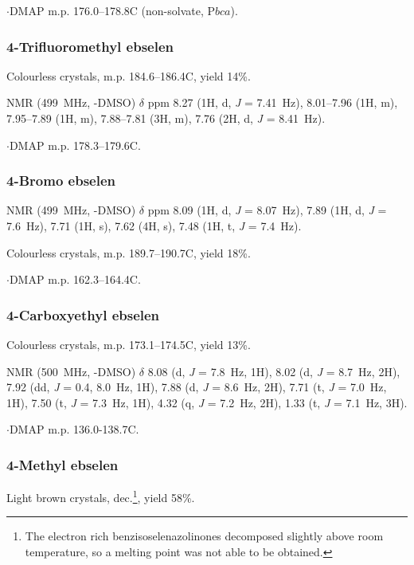 \begin{refsection}
$ \cdot $DMAP m.p. 176.0--178.8\degree{}C (non-solvate, P$bca$).


\subsubsection{4-Trifluoromethyl ebselen }
Colourless crystals, m.p. 184.6--186.4\degree{}C, yield 14\%.

 NMR (499~MHz, -DMSO) $ \delta $ ppm 8.27 (1H, d, \textit{J} = 7.41~Hz), 8.01--7.96 (1H, m), 7.95--7.89 (1H, m), 7.88--7.81 (3H, m), 7.76 (2H, d, \textit{J} = 8.41~Hz).

$ \cdot $DMAP m.p. 178.3--179.6\degree{}C.


\subsubsection{4-Bromo ebselen } 

 NMR (499~MHz, -DMSO) $ \delta $ ppm 8.09 (1H, d, \textit{J} = 8.07~Hz), 7.89 (1H, d, \textit{J} = 7.6~Hz), 7.71 (1H, s), 7.62 (4H, s), 7.48 (1H, t, \textit{J} = 7.4~Hz).

Colourless crystals, m.p. 189.7--190.7\degree{}C, yield 18\%.

$ \cdot $DMAP m.p. 162.3--164.4\degree{}C.


\subsubsection{4-Carboxyethyl ebselen }
Colourless crystals, m.p. 173.1--174.5\degree{}C, yield 13\%.

 NMR (500~MHz, -DMSO) $ \delta $ 8.08 (d, \textit{J} = 7.8~Hz, 1H), 8.02 (d, \textit{J} = 8.7~Hz, 2H), 7.92 (dd, \textit{J} = 0.4, 8.0~Hz, 1H), 7.88 (d, \textit{J} = 8.6~Hz, 2H), 7.71 (t, \textit{J} = 7.0~Hz, 1H), 7.50 (t, \textit{J} = 7.3~Hz, 1H), 4.32 (q, \textit{J} = 7.2~Hz, 2H), 1.33 (t, \textit{J} = 7.1~Hz, 3H).

$ \cdot $DMAP m.p. 136.0-138.7\degree{}C.


\subsubsection{4-Methyl ebselen }
Light brown crystals, dec.\footnote{\label{fn:decompose} The electron rich benzisoselenazolinones decomposed slightly above room temperature, so a melting point was not able to be obtained.}, yield 58\%.


\end{refsection}
